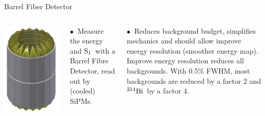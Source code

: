\documentclass [aspectratio=169]{beamer}
\newcommand{\BI}{\ensuremath{{}^{214}{\rm Bi}}}
\newcommand{\so}{\ensuremath{\rm S_1}}
\begin{document}
\begin{frame}{Barrel Fiber Detector}
\begin{columns}
\includegraphics[scale=0.28]{cad.png}


$\bullet~$ Measure the energy and \so\ with a Barrel Fibre Detector, read out by (cooled) SiPMs.

$\bullet~$ Reduces background budget, simplifies mechanics and should allow improve energy resolution (smoother energy map). Improve energy resolution reduces all backgrounds. With 0.5\% FWHM, most backgrounds are reduced by a factor 2 and \BI\ by a factor 4. 

\end{columns}
\end{frame}
\end{document}
